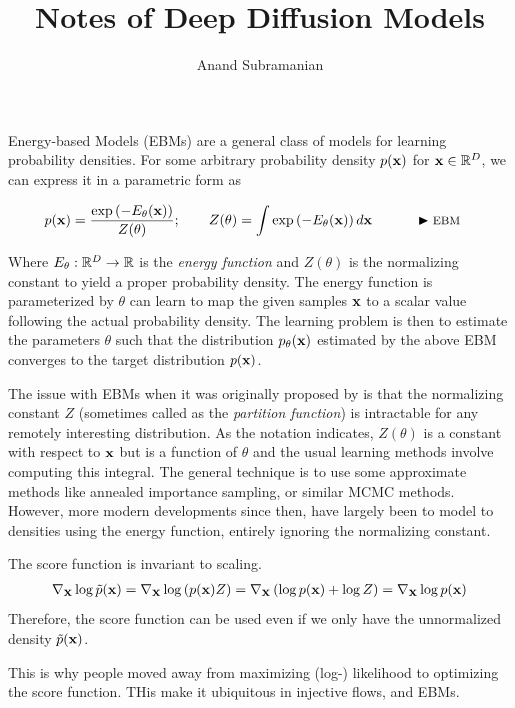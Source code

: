 \documentclass[a4paper, 11pt]{article}
\title{Notes of Deep Diffusion Models}
\author{Anand Subramanian}
\date{}
\begin{document}
 
\maketitle

\tableofcontents


Energy-based Models (EBMs) are a general class of models for learning probability densities. For some arbitrary probability density $p(\mbox{$\mbox{$\mathbf{x}$}$})$ for $\mbox{$\mbox{$\mathbf{x}$}$} \in \mathbb{R}^D$, we can express it in a parametric form as

\begin{align}
p(\mbox{$\mbox{$\mathbf{x}$}$}) &= \frac{\exp \left(-E_\theta(\mbox{$\mbox{$\mathbf{x}$}$})\right)}{Z(\theta)}; \qquad Z(\theta) = \int \exp \left (-E_\theta(\mbox{$\mbox{$\mathbf{x}$}$}) \right) d\mbox{$\mbox{$\mathbf{x}$}$} && \qquad \blacktriangleright\text{\footnotesize EBM}
\end{align} 

Where $E_\theta: \mathbb{R}^D \to \mathbb{R}$ is the \textit{energy function} and $Z(\theta)$ is the normalizing constant to yield a proper probability density. The energy function is parameterized by $\theta$ can learn to map the given samples $\mbox{$\mbox{$\mathbf{x}$}$}$ to a scalar value following the actual probability density. The learning problem is then to estimate the parameters $\theta$ such that the distribution $p_\theta(\mbox{$\mbox{$\mathbf{x}$}$})$ estimated by the above EBM converges to the target distribution $p(\mbox{$\mbox{$\mathbf{x}$}$})$.

The issue with EBMs when it was originally proposed by \cite{lecun2006tutorial} is that the normalizing constant $Z$ (sometimes called as the \textit{partition function}) is intractable for any remotely interesting distribution. As the notation indicates, $Z(\theta)$ is a constant with respect to $\mbox{$\mbox{$\mathbf{x}$}$}$ but is a function of $\theta$ and the usual learning methods involve computing this integral. The general technique is to use some approximate methods like annealed importance sampling, or similar MCMC methods. However, more modern developments since then, have largely been to model to densities using the energy function, entirely ignoring the normalizing constant.

The score function is invariant to scaling. 
\begin{align}
    \nabla_{\mbox{$\mbox{$\mathbf{x}$}$}} \log \tilde{p}(\mbox{$\mbox{$\mathbf{x}$}$}) = \nabla_{\mbox{$\mbox{$\mathbf{x}$}$}} \log \left ( p(\mbox{$\mbox{$\mathbf{x}$}$}) Z \right ) = \nabla_{\mbox{$\mbox{$\mathbf{x}$}$}} \left (  \log p(\mbox{$\mbox{$\mathbf{x}$}$}) + \log Z \right ) = \nabla_{\mbox{$\mbox{$\mathbf{x}$}$}} \log  p(\mbox{$\mbox{$\mathbf{x}$}$})
\end{align}
Therefore, the score function can be used even if we only have the unnormalized density $\tilde{p}(\mbox{$\mbox{$\mathbf{x}$}$})$. 

This is why people moved away from maximizing (log-) likelihood to optimizing the score function. THis make it ubiquitous in injective flows, and EBMs.
\end{document}
